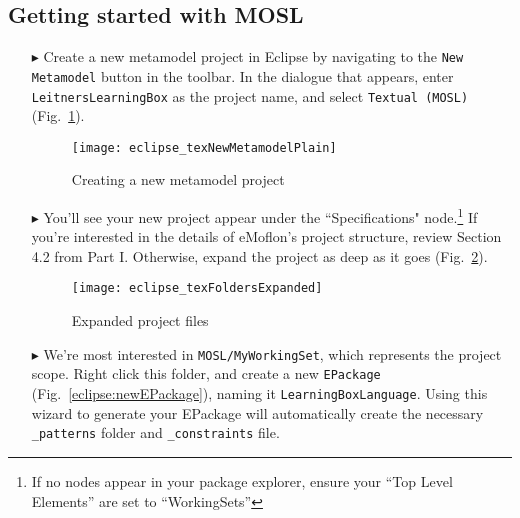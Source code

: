 \clearpage
\subsection{Getting started with MOSL}
\texHeader
\hypertarget{static:starting tex}{} 

\begin{itemize}

\item[$\blacktriangleright$] Create a new metamodel project in Eclipse by navigating to the \texttt{New Metamodel} button in the toolbar. In the dialogue that
appears, enter \texttt{LeitnersLearningBox} as the project name, and select \texttt{Textual (MOSL)}  (Fig.~\ref{eclipse:newProject}).

\vspace{1cm}

\begin{figure}[htbp]
	\centering
  \texttt{[image: eclipse\_texNewMetamodelPlain]}
	\caption{Creating a new metamodel project}
	\label{eclipse:newProject}
\end{figure}

\vspace{1cm}

\item[$\blacktriangleright$] You'll see your new project appear under the ``Specifications" node.\footnote{If no nodes appear in your package explorer,
ensure your ``Top Level Elements'' are set to ``WorkingSets''} If you're interested in the details of eMoflon's project structure, review Section
4.2 from Part I. Otherwise, expand the project as deep as it goes (Fig.~\ref{eclipse:expandedFolders}).

\clearpage

\begin{figure}[htbp]
	\centering
  \texttt{[image: eclipse\_texFoldersExpanded]}
	\caption{Expanded project files}
	\label{eclipse:expandedFolders}
\end{figure} 

\vspace{0.5cm}

\item[$\blacktriangleright$] We're most interested in \texttt{MOSL/MyWorkingSet}, which represents the project scope. Right click this folder, and create a new
\texttt{EPackage} (Fig.~\ref{eclipse:newEPackage}), naming it \texttt{LearningBoxLanguage}. Using this wizard to generate your EPackage will automatically
create the necessary \texttt{\_patterns} folder and \texttt{\_constraints} file.


\end{itemize}

